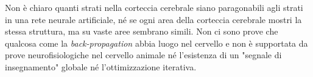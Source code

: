 \par Non è chiaro quanti strati nella corteccia cerebrale siano paragonabili agli strati in una rete neurale artificiale, né se ogni area della corteccia cerebrale mostri la stessa struttura, ma su vaste aree sembrano simili. Non ci sono prove che qualcosa come la \textit{back-propagation} abbia luogo nel cervello e non è supportata da prove neurofisiologiche nel cervello animale né l'esistenza di un "segnale di insegnamento" globale né l'ottimizzazione iterativa.

\clearpage









